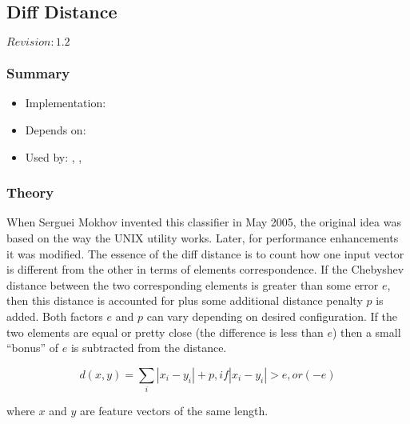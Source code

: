 \subsection{Diff Distance}
\label{sect:diff-distance}

$Revision: 1.2 $

\subsubsection{Summary}

\begin{itemize}
\item Implementation: 
\item Depends on: 
\item Used by: , , 
\end{itemize}

\subsubsection{Theory}

When Serguei Mokhov invented this classifier in May 2005, the original idea
was based on the way the  UNIX utility works. Later, for
performance enhancements it was modified. The essence of the diff distance is to
count how one input vector is different from the other in terms of
elements correspondence. If the Chebyshev distance between the two
corresponding elements is greater than some error $e$, then this
distance is accounted for plus some additional distance penalty $p$
is added. Both factors $e$ and $p$ can vary depending on desired
configuration. If the two elements are equal or pretty close
(the difference is less than $e$) then a small ``bonus'' of $e$ is subtracted
from the distance.

$$ d(x,y) = \sum_{i}{|x_i-y_i| + p, \mathit{if} |x_i-y_i| > e, \mathit{or} (-e)} $$

\noindent
where $x$ and $y$ are feature vectors of the same length.


